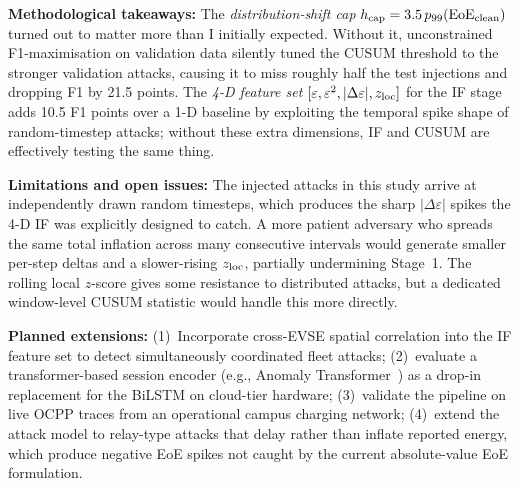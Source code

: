 \documentclass[journal]{IEEEtran}
\begin{document}
\textbf{Methodological takeaways:}
The \emph{distribution-shift cap}
$h_{\rm cap}=3.5\,p_{99}(\text{EoE}_{\rm clean})$
turned out to matter more than I initially expected.
Without it, unconstrained F1-maximisation on validation data
silently tuned the CUSUM threshold to the stronger validation
attacks, causing it to miss roughly half the test injections
and dropping F1 by 21.5 points.
The \emph{4-D feature set}
$[\varepsilon,\varepsilon^2,|\Delta\varepsilon|,z_{\rm loc}]$
for the IF stage adds 10.5 F1 points over a 1-D baseline by
exploiting the temporal spike shape of random-timestep attacks;
without these extra dimensions, IF and CUSUM are effectively
testing the same thing.

\textbf{Limitations and open issues:}
The injected attacks in this study arrive at independently drawn
random timesteps, which produces the sharp $|\Delta\varepsilon|$
spikes the 4-D IF was explicitly designed to catch.
A more patient adversary who spreads the same total inflation
across many consecutive intervals would generate smaller
per-step deltas and a slower-rising $z_{\rm loc}$, partially
undermining Stage~1.
The rolling local $z$-score gives some resistance to distributed
attacks, but a dedicated window-level CUSUM statistic would
handle this more directly.

\textbf{Planned extensions:}
(1)~Incorporate cross-EVSE spatial correlation into the IF
feature set to detect simultaneously coordinated fleet attacks;
(2)~evaluate a transformer-based session encoder (e.g., Anomaly
Transformer~\cite{xu2022anomaly}) as a drop-in replacement for
the BiLSTM on cloud-tier hardware;
(3)~validate the pipeline on live OCPP traces from an operational
campus charging network;
(4)~extend the attack model to relay-type attacks that delay
rather than inflate reported energy, which produce negative EoE
spikes not caught by the current absolute-value EoE formulation.
\end{document}
